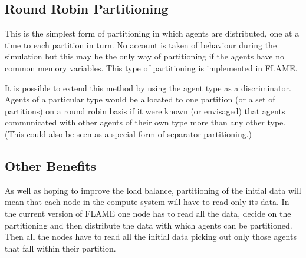 \subsection{Round Robin Partitioning}

This is the simplest form of partitioning in which agents are distributed, one at a time to each partition in turn. No account is taken of behaviour during the simulation but this may be the only way of partitioning if the agents have no common memory variables. This type of partitioning is implemented in FLAME.

It is possible to extend this method by using the agent type as a discriminator. Agents of a particular type would be allocated to one partition (or a set of partitions) on a round robin basis if it were known (or envisaged) that agents communicated with other agents of their own type more than any other type. (This could also be seen as a special form of separator partitioning.)

\subsection{Other Benefits}

As well as hoping to improve the load balance, partitioning of the initial data will mean that each node in the compute system will have to read only its data. In the current version of FLAME one node has to read all the data, decide on the partitioning and then distribute the data with which agents can be partitioned. Then all the nodes have to read all the initial data picking out only those agents that fall within their partition.


